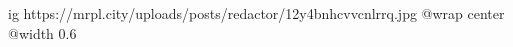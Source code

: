  
 
 
 
 

\ifcmt
  ig https://mrpl.city/uploads/posts/redactor/12y4bnhcvvcnlrrq.jpg
  @wrap center
  @width 0.6
\fi
